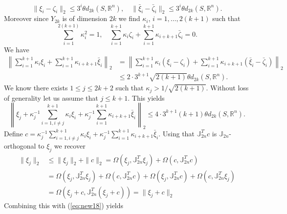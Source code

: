 \documentclass[final]{siamart}
\begin{document}
\begin{equation}
	\| \xi_i - \zeta_i \|_2 \leq 3^i \theta d_{2k}(S,\mathbb R^n),\quad \| \bar{\xi}_i - \bar{\zeta}_i \|_2 \leq 3^i \theta d_{2k}(S,\mathbb R^n).
\end{equation}
Moreover since $Y_{2k}$ is of dimension $2k$ we find $\kappa_i$, $i=1,\dots,2(k+1)$ such that
\begin{equation} \label{eq:new15}
	\sum_{i=1}^{2(k+1)} \kappa_i^2 = 1, \quad\sum_{i=1}^{k+1} \kappa_i \zeta_i + \sum_{i=1}^{k+1} \kappa_{i+k+1} \bar{\zeta}_i = 0.
\end{equation}
We have
\begin{equation} \label{eq:new17}
\begin{aligned}
	\left\| \sum_{i=1}^{k+1} \kappa_i \xi_i + \sum_{i=1}^{k+1} \kappa_{i+k+1} \bar{\xi}_i \right\|_2 &= \left\| \sum_{i=1}^{k+1} \kappa_i (\xi_i - \zeta_i) + \sum_{i=1}^{k+1} \kappa_{i+k+1} (\bar{\xi}_i-\bar{\zeta}_i) \right\|_2 \\
	&\leq 2\cdot 3^{k+1} \sqrt{2(k+1)} \theta d_{2k}(S,\mathbb R^n).
\end{aligned}
\end{equation}
We know there exists $1 \leq j\leq 2k+2$ such that $\kappa_j > 1/\sqrt{2(k+1)}$. Without loss of generality let us assume that $j\leq k+1$. This yields
\begin{equation} \label{eq:new18}
	\left\| \xi_j +  \kappa_j^{-1} \sum_{i=1,i\neq j}^{k+1} \kappa_i \xi_i + \kappa_j^{-1}\sum_{i=1}^{k+1} \kappa_{i+k+1} \bar{\xi}_i \right\|_2 \leq 4\cdot 3^{k+1} (k+1) \theta d_{2k}(S,\mathbb R^n).
\end{equation}
Define $c = \kappa_j^{-1} \sum_{i=1,i\neq j}^{k+1} \kappa_i \xi_i + \kappa_j^{-1}\sum_{i=1}^{k+1} \kappa_{i+k+1} \bar{\xi}_i$. Using that $\mathbb{J}_{2n}^T c$ is {{\color{black}} $\mathbb J_{2n}$-orthogonal} to $\xi_j$ we recover
\begin{equation} \label{eq:new19}
\begin{aligned}
	\| \xi_j \|_2 &\leq \| \xi_j \|_2 + \| c \|_2 = \Omega(\xi_j,\mathbb{J}_{2n}^T \xi_j) + \Omega(c,\mathbb{J}_{2n}^T c) \\
	       &= \Omega(\xi_j,\mathbb{J}_{2n}^T \xi_j) + \Omega(c,\mathbb{J}_{2n}^T c) + \Omega(\xi_j,\mathbb{J}_{2n}^T c) + \Omega(c,\mathbb{J}_{2n}^T \xi_j) \\
       	&= \Omega(\xi_j + c, \mathbb{J}^T_{2n} (\xi_j + c)) = \| \xi_j + c \|_2	
\end{aligned}
\end{equation}
Combining this with (\ref{eq:new18}) yields
\end{document}
